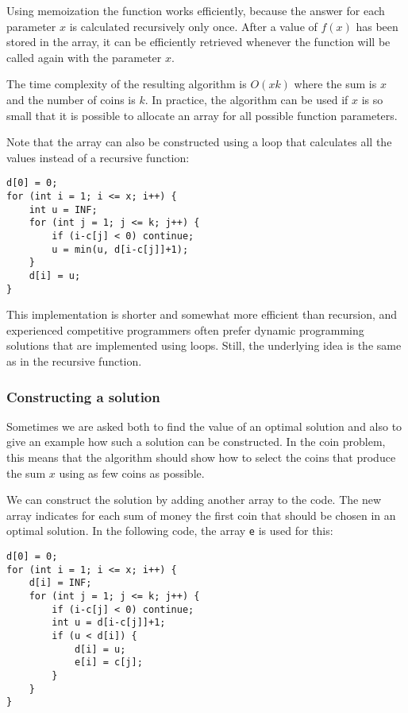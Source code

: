 Using memoization the function works
efficiently, because the answer for each parameter $x$
is calculated recursively only once.
After a value of $f(x)$ has been stored in the array,
it can be efficiently retrieved whenever the
function will be called again with the parameter $x$.

The time complexity of the resulting algorithm
is $O(xk)$ where the sum is $x$ and the number of
coins is $k$.
In practice, the algorithm can be used if
$x$ is so small that it is possible to allocate
an array for all possible function parameters.

Note that the array can also be constructed using
a loop that calculates all the values
instead of a recursive function:
\begin{lstlisting}
d[0] = 0;
for (int i = 1; i <= x; i++) {
    int u = INF;
    for (int j = 1; j <= k; j++) {
        if (i-c[j] < 0) continue;
        u = min(u, d[i-c[j]]+1);
    }
    d[i] = u;
}
\end{lstlisting}

This implementation is shorter and somewhat
more efficient than recursion,
and experienced competitive programmers
often prefer dynamic programming solutions
that are implemented using loops.
Still, the underlying idea is the same as
in the recursive function.

\subsubsection{Constructing a solution}

Sometimes we are asked both to find the value
of an optimal solution and also to give
an example how such a solution can be constructed.
In the coin problem, this means that the algorithm
should show how to select the coins that produce
the sum $x$ using as few coins as possible.

We can construct the solution by adding another
array to the code. The new array indicates for
each sum of money the first coin that should be
chosen in an optimal solution.
In the following code, the array \texttt{e}
is used for this:

\begin{lstlisting}
d[0] = 0;
for (int i = 1; i <= x; i++) {
    d[i] = INF;
    for (int j = 1; j <= k; j++) {
        if (i-c[j] < 0) continue;
        int u = d[i-c[j]]+1;
        if (u < d[i]) {
            d[i] = u;
            e[i] = c[j];
        }
    }
}
\end{lstlisting}

